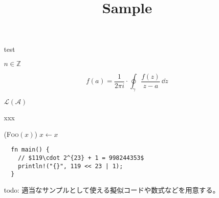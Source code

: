 \documentclass[lualatex, ja=standard]{ltjsarticle}
\author{\lato{\textcolor{useryellow}{\textbf{rsk0315}}}}
\title{Sample \directlua{commit_hash_and_date("\jobname.tex")}}
\begin{document}
\maketitle

test

$n \in \mathbb{Z}$

$$
f(a) = \frac{1}{2\pi i}\cdot \oint_{\gamma} \frac{f(z)}{z-a} \, \dd{z}
$$

$\mathcal{L}(\mathcal{A})$

\begin{alg}
  \caption{xxx}
  \Function(\textsc{Foo}{$(x)$}){
    {$x \gets x$}\;
  }
\end{alg}

\begin{verbatim}
  fn main() {
    // $119\cdot 2^{23} + 1 = 998244353$
    println!("{}", 119 << 23 | 1);
  }
\end{verbatim}

todo: 適当なサンプルとして使える擬似コードや数式などを用意する。
\end{document}
